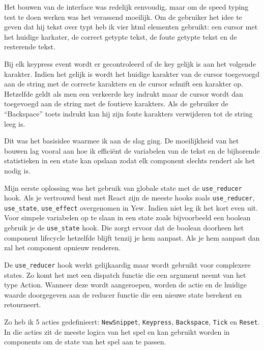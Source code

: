 \clearpage

Het bouwen van de interface was redelijk eenvoudig, maar om de speed typing test te doen werken was
het verassend moeilijk. Om de gebruiker het idee te geven dat hij tekst over typt heb ik vier html
elementen gebruikt: een cursor met het huidige karkater, de correct getypte tekst, de foute getypte
tekst en de resterende tekst.

Bij elk keypress event wordt er gecontroleerd of de key gelijk is aan het volgende karakter. Indien
het gelijk is wordt het huidige karakter van de cursor toegevoegd aan de string met de correcte
karakters en de cursor schuift een karakter op. Hetzelfde geldt als men een verkeerde key indrukt
maar de cursor wordt dan toegevoegd aan de string met de foutieve karakters. Als de gebruiker de
“Backspace” toets indrukt kan hij zijn foute karakters verwijderen tot de string leeg is. 

Dit was het basisidee waarmee ik aan de slag ging. De moeilijkheid van het bouwen lag vooral aan hoe
ik efficiënt de variabelen van de tekst en de bijhorende statistieken in een state kan opslaan zodat
elk component slechts rendert als het nodig is.  

Mijn eerste oplossing was het gebruik van globale state met de \texttt{use_reducer}
hook. Als je vertrouwd bent met React zijn de meeste hooks zoals \texttt{use_reducer},
\texttt{use_state}, \texttt{use_effect} overgenomen in Yew. Indien niet leg
ik het kort even uit. Voor simpele variabelen op te slaan in een state zoals bijvoorbeeld een
boolean gebruik je de \texttt{use_state} hook. Die zorgt ervoor dat de boolean doorheen
het component lifecycle hetzelfde blijft tenzij je hem aanpast. Als je hem aanpast dan zal het
component opnieuw renderen.  

De \texttt{use_reducer} hook werkt gelijkaardig maar wordt gebruikt voor complexere
states. Zo komt het met een dispatch functie die een argument neemt van het type Action. Wanneer
deze wordt aangeroepen, worden de actie en de huidige waarde doorgegeven aan de reducer functie die
een nieuwe state berekent en retourneert.

Zo heb ik 5 acties gedefinieert: \texttt{NewSnippet}, \texttt{Keypress},
\texttt{Backspace}, \texttt{Tick} en \texttt{Reset}. In die acties zit
de meeste logica van het spel en kan gebruikt worden in components om de state van het spel aan te
passen. 

